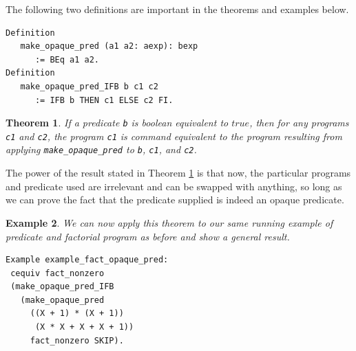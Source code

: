 \documentclass[compsoc,conference,a4paper,10pt,times]{IEEEtran}
\newtheorem{theorem}{Theorem}[section]
\newtheorem{example}[theorem]{Example}
\begin{document}
The following two definitions are important in the theorems and examples below.
\begin{verbatim}
Definition 
   make_opaque_pred (a1 a2: aexp): bexp 
      := BEq a1 a2.
Definition 
   make_opaque_pred_IFB b c1 c2 
      := IFB b THEN c1 ELSE c2 FI.
\end{verbatim}

\begin{theorem}\label{generalcequiv}
If a predicate \texttt{b} is boolean equivalent to $true$, then for any programs \texttt{c1} and \texttt{c2},
the program \texttt{c1} is command equivalent to the program resulting from applying \texttt{make\_opaque\_pred}
to \texttt{b}, \texttt{c1}, and \texttt{c2}. 
\end{theorem}

The power of the result stated in Theorem \ref{generalcequiv}
is that now, the particular programs and predicate used are irrelevant and can be swapped with anything, so long as we can prove the fact that the predicate supplied is indeed an opaque predicate. 

\begin{example}\label{factopaqueex}
We can now apply this theorem to our same running example of predicate and factorial program as before and show a general result.
\begin{verbatim}
Example example_fact_opaque_pred: 
 cequiv fact_nonzero 
 (make_opaque_pred_IFB 
   (make_opaque_pred 
     ((X + 1) * (X + 1)) 
      (X * X + X + X + 1)) 
     fact_nonzero SKIP).
\end{verbatim}
\end{example}



\end{document}
